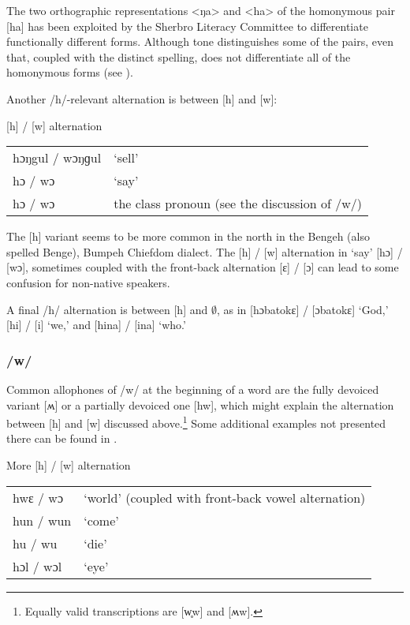 The two orthographic representations <ŋa> and <ha> of the homonymous pair [ha] has been exploited by the Sherbro Literacy Committee to differentiate functionally different forms. Although tone distinguishes some of the pairs, even that, coupled with the distinct spelling, does not differentiate all of the homonymous forms (see ).

Another /h/-relevant alternation is between [h] and [w]:

\ea%
\label{ex:27}{[h] / [w] alternation}\\
\vspace{6pt}

\begin{tabular}[t]{ll}
hɔŋgul / wɔŋɡul & ‘sell'\\
hɔ / wɔ & ‘say'\\
hɔ / wɔ & the class pronoun (see the discussion of /w/)\\
\end{tabular}
\z

The [h] variant seems to be more common in the north in the Bengeh (also spelled Benge), Bumpeh Chiefdom dialect. The [h] / [w] alternation in ‘say' [hɔ] / [wɔ], sometimes coupled with the front-back alternation [ɛ] / [ɔ] can lead to some confusion for non-native speakers.

A final /h/ alternation is between [h] and ${\emptyset}$, as in [hɔbatokɛ] / [ɔbatokɛ] ‘God,' [hi] / [i] ‘we,' and [hina] / [ina] ‘who.'

\subsubsection{/w/}
\label{sec:2.1.2.8}
Common allophones of /w/ at the beginning of a word are the fully devoiced variant [ʍ] or a partially devoiced one [hw], which might explain the alternation between [h] and [w] discussed above.\footnote{Equally valid transcriptions are [w̥w] and [ʍw].} Some additional examples not presented there can be found in .

\ea%
\label{ex:28}{More [h] / [w] alternation}\\ 
\vspace{6pt}
\begin{tabular}[t]{ll}
hwɛ / wɔ & ‘world' (coupled with front-back vowel alternation)\\
hun / wun & ‘come'\\
hu / wu  & ‘die'\\ 
hɔl / wɔl  & ‘eye'\\
\end{tabular}
\z

